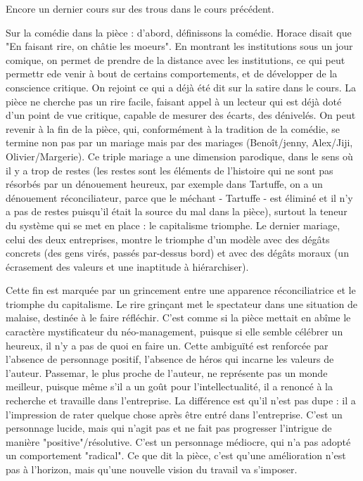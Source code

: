 \documentclass[a4paper,12pt]{book}
\begin{document}
\par Encore un dernier cours sur des trous dans le cours précédent.
\par Sur la comédie dans la pièce : d'abord, définissons la comédie. Horace disait que "En faisant rire, on châtie les moeurs". En montrant les institutions sous un jour comique, on permet de prendre de la distance avec les institutions, ce qui peut permettr ede venir à bout de certains comportements, et de développer de la conscience critique. On rejoint ce qui a déjà été dit sur la satire dans le cours. La pièce ne cherche pas un rire facile, faisant appel à un lecteur qui est déjà doté d'un point de vue critique, capable de mesurer des écarts, des dénivelés. On peut revenir à la fin de la pièce, qui, conformément à la tradition de la comédie, se termine non pas par un mariage mais par des mariages (Benoît/jenny, Alex/Jiji, Olivier/Margerie). Ce triple mariage a une dimension parodique, dans le sens où il y a trop de restes (les restes sont les éléments de l'histoire qui ne sont pas résorbés par un dénouement heureux, par exemple dans Tartuffe, on a un dénouement réconciliateur, parce que le méchant - Tartuffe - est éliminé et il n'y a pas de restes puisqu'il était la source du mal dans la pièce), surtout la teneur du système qui se met en place : le capitalisme triomphe. Le dernier mariage, celui des deux entreprises, montre le triomphe d'un modèle avec des dégâts concrets (des gens virés, passés par-dessus bord) et avec des dégâts moraux (un écrasement des valeurs et une inaptitude à hiérarchiser).
\par Cette fin est marquée par un grincement entre une apparence réconciliatrice et le triomphe du capitalisme. Le rire grinçant met le spectateur dans une situation de malaise, destinée à le faire réfléchir. C'est comme si la pièce mettait en abîme le caractère mystificateur du néo-management, puisque si elle semble célébrer un heureux, il n'y a pas de quoi en faire un. Cette ambiguïté est renforcée par l'absence de personnage positif, l'absence de héros qui incarne les valeurs de l'auteur. Passemar, le plus proche de l'auteur, ne représente pas un monde meilleur, puisque même s'il a un goût pour l'intellectualité, il a renoncé à la recherche et travaille dans l'entreprise. La différence est qu'il n'est pas dupe : il a l'impression de rater quelque chose après être entré dans l'entreprise. C'est un personnage lucide, mais qui n'agit pas et ne fait pas progresser l'intrigue de manière "positive"/résolutive. C'est un personnage médiocre, qui n'a pas adopté un comportement "radical". Ce que dit la pièce, c'est qu'une amélioration n'est pas à l'horizon, mais qu'une nouvelle vision du travail va s'imposer.
\end{document}
